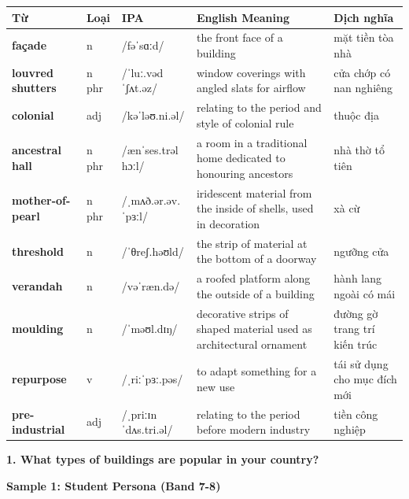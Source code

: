 \vspace{0.8em}
\begin{center}
\renewcommand{\arraystretch}{1.65}
\begin{tabularx}{\textwidth}{|V{0.22\textwidth}|C{0.07\textwidth}|I{0.20\textwidth}|Y|V{0.18\textwidth}|}
\hline
{}
\textbf{Từ} & \textbf{Loại} & \textbf{IPA} & \textbf{English Meaning} & \textbf{Dịch nghĩa} \\
\hline
\textbf{façade} & n & /fəˈsɑːd/ & the front face of a building & mặt tiền tòa nhà \\ \hline
\textbf{louvred shutters} & n phr & /ˈluː.vəd ˈʃʌt.əz/ & window coverings with angled slats for airflow & cửa chớp có nan nghiêng \\ \hline
\textbf{colonial} & adj & /kəˈləʊ.ni.əl/ & relating to the period and style of colonial rule & thuộc địa \\ \hline
\textbf{ancestral hall} & n phr & /ænˈses.trəl hɔːl/ & a room in a traditional home dedicated to honouring ancestors & nhà thờ tổ tiên \\ \hline
\textbf{mother-of-pearl} & n phr & /ˌmʌð.ər.əv.ˈpɜːl/ & iridescent material from the inside of shells, used in decoration & xà cừ \\ \hline
\textbf{threshold} & n & /ˈθreʃ.həʊld/ & the strip of material at the bottom of a doorway & ngưỡng cửa \\ \hline
\textbf{verandah} & n & /vəˈræn.də/ & a roofed platform along the outside of a building & hành lang ngoài có mái \\ \hline
\textbf{moulding} & n & /ˈməʊl.dɪŋ/ & decorative strips of shaped material used as architectural ornament & đường gờ trang trí kiến trúc \\ \hline
\textbf{repurpose} & v & /ˌriːˈpɜː.pəs/ & to adapt something for a new use & tái sử dụng cho mục đích mới \\ \hline
\textbf{pre-industrial} & adj & /ˌpriːɪnˈdʌs.tri.əl/ & relating to the period before modern industry & tiền công nghiệp \\ \hline
\end{tabularx}
\end{center}

\partthreeheader

\begin{ieltsquestion}
\textbf{1. What types of buildings are popular in your country?}
\end{ieltsquestion}
\textbf{Sample 1: Student Persona (Band 7-8)}

